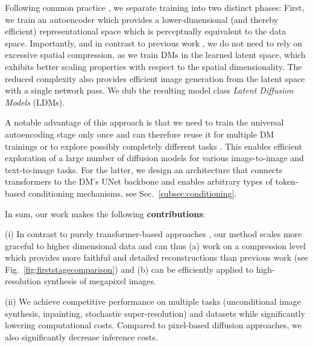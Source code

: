 \documentclass[10pt,twocolumn,letterpaper]{article}
\begin{document}
Following common practice \cite{DBLP:conf/nips/OordVK17, DBLP:conf/nips/RazaviOV19, DBLP:journals/corr/abs-2012-09841, DBLP:conf/iclr/DaiW19, DBLP:journals/corr/abs-2102-12092}, 
we separate training into two distinct phases: First, we train an autoencoder %
which provides a lower-dimensional (and thereby efficient) representational space which is perceptually equivalent to the data space.
Importantly, and in contrast to previous work \cite{DBLP:journals/corr/abs-2012-09841, DBLP:journals/corr/abs-2102-12092}, 
we do not need to 
rely on excessive spatial compression, as we train DMs in the learned latent space, which
exhibits better scaling properties with respect to the spatial dimensionality. 
%
%
%
The reduced complexity also provides efficient image generation from the latent space with a single network pass. 
%
%
%
%
%
%
%
%
%
%
%
%
%
%
%
    We dub the resulting model class \emph{Latent Diffusion Models} (LDMs).
%

A notable
 advantage of this approach is that we need to train the universal
    autoencoding stage only once and can therefore reuse it for multiple DM
    trainings or to explore possibly completely different tasks
    \cite{clipguiding}.
This enables efficient exploration of a large number of diffusion models for various image-to-image and text-to-image tasks. 
For the latter, we design an architecture that connects transformers to the DM's UNet backbone \cite{DBLP:conf/miccai/RonnebergerFB15} 
and enables arbitrary types of token-based conditioning mechanisms, see Sec.~\ref{subsec:conditioning}.
%
%
%
%
%

%

%
%
%
%
\perceptualcompression
%

%
%
%
\enlargethispage{\baselineskip}
In sum, our work makes the following \textbf{contributions}:

(i) In contrast to purely transformer-based approaches \cite{DBLP:journals/corr/abs-2012-09841, DBLP:journals/corr/abs-2102-12092}, our 
method scales more graceful to higher dimensional data and can thus (a) work on a compression level which provides more faithful and detailed reconstructions than previous work (see Fig.~\ref{fig:firststagecomparison}) and (b) can be efficiently applied to high-resolution synthesis of megapixel images.

%
(ii) We achieve competitive performance on multiple tasks (unconditional image synthesis, inpainting, stochastic super-resolution)
and datasets while significantly lowering computational costs.
Compared to pixel-based diffusion approaches, we also significantly decrease inference costs.
\end{document}
